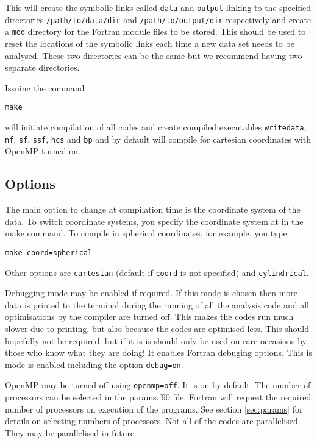 \documentclass[12pt]{article}
\begin{document}
    This will create the symbolic links called \texttt{data} and \texttt{output} linking to the specified directories \texttt{/path/to/data/dir} and \texttt{/path/to/output/dir} respectively and create a \texttt{mod} directory for the Fortran module files to be stored. This should be used to reset the locations of the symbolic links each time a new data set needs to be analysed. These two directories can be the same but we recommend having two separate directories.

    Issuing the command

    \texttt{make}

    will initiate compilation of all codes and create compiled executables \texttt{writedata}, \texttt{nf}, \texttt{sf}, \texttt{ssf}, \texttt{hcs} and \texttt{bp} and by default will compile for cartesian coordinates with OpenMP turned on.

    \subsection{Options}

      The main option to change at compilation time is the coordinate system of the data. To switch coordinate systems, you specify the coordinate system at in the make command. To compile in spherical coordinates, for example, you type

      \texttt{make coord=spherical}

      Other options are \texttt{cartesian} (default if \texttt{coord} is not specified) and \texttt{cylindrical}.

      Debugging mode may be enabled if required. If this mode is chosen then more data is printed to the terminal during the running of all the analysis code and all optimisations by the compiler are turned off. This makes the codes run much slower due to printing, but also because the codes are optimised less. This should hopefully not be required, but if it is is should only be used on rare occasions by those who know what they are doing! It enables Fortran debuging options. This is mode is enabled including the option \texttt{debug=on}.

      OpenMP may be turned off using \texttt{openmp=off}. It is on by default. The number of processors can be selected in the params.f90 file, Fortran will request the required number of processors on execution of the programs. See section \ref{sec:params} for details on selecting numbers of processors. Not all of the codes are parallelised. They may be parallelised in future.
\end{document}
